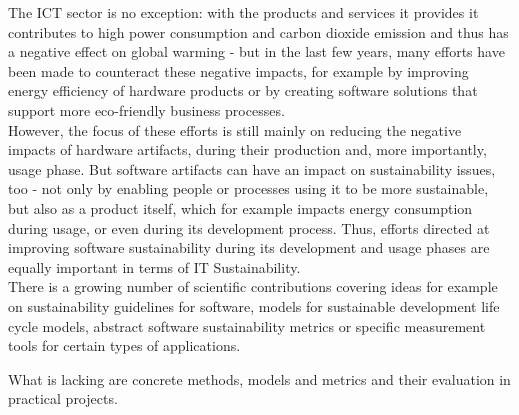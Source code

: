 \documentclass[oribibl]{llncs}
\begin{document}
The ICT sector is no exception: with the products and services it provides it contributes to high power consumption and carbon dioxide emission %
and thus has a negative effect on global warming \cite{smart2020} %
- but in the last few years, many efforts have been made to counteract these negative impacts, for example by improving energy efficiency of hardware products or by creating software solutions that support more eco-friendly business processes.\\
However, the focus of these efforts is still mainly on reducing the negative impacts of hardware artifacts, %
during their production and, more importantly, usage phase. But software artifacts can have an impact on sustainability issues, too - not only by enabling people or processes using it to be more sustainable, but also as a product itself, which for example impacts energy consumption during usage, or even during its development process. %
Thus, efforts directed at improving software sustainability during its development and usage phases are equally important in terms of IT Sustainability.\\
There is a growing number of scientific contributions covering ideas for example on sustainability guidelines for software, models for sustainable development life cycle models, abstract software sustainability metrics or specific measurement tools for certain types of applications. %

What is lacking %
are %
concrete methods, models and metrics and their evaluation in practical projects. %
\end{document}

